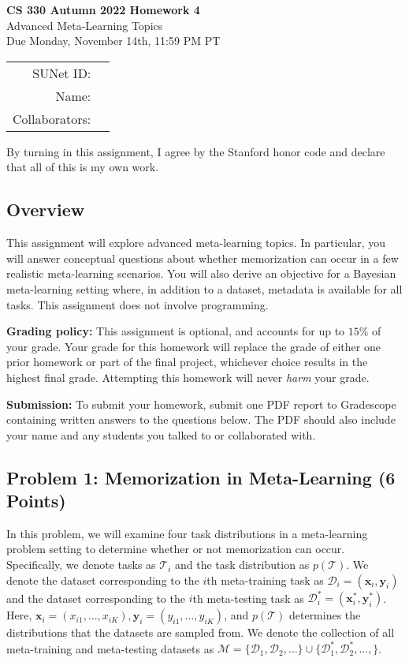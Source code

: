 \documentclass[12pt]{article}
\begin{document}
\begin{center}
{\Large \textbf{CS 330 Autumn 2022 Homework 4} \\ 
Advanced Meta-Learning Topics
\\ 
\vspace{0.2cm}
Due Monday, November 14th, 11:59 PM PT}

\begin{tabular}{rl}
SUNet ID: &  \\
Name: & \\
Collaborators: & 
\end{tabular}
\end{center}

By turning in this assignment, I agree by the Stanford honor code and declare that all of this is my own work.

\subsection*{Overview}
This assignment will explore advanced meta-learning topics.
In particular, you will answer conceptual questions about whether memorization can occur in a few realistic meta-learning scenarios.
You will also derive an objective for a Bayesian meta-learning setting where, in addition to a dataset, metadata is available for all tasks.
This assignment does not involve programming.

\textbf{Grading policy:} This assignment is optional, and accounts for up to $15\%$ of your grade. Your grade for this homework will replace the grade of either one prior homework or part of the final project, whichever choice results in the highest final grade. Attempting this homework will never \textit{harm} your grade.

\textbf{Submission:} To submit your homework, submit one PDF report to Gradescope containing written answers to the questions below. The PDF should also include your name and any students you talked to or collaborated with.


\subsection*{Problem 1: Memorization in Meta-Learning (6 Points)}
In this problem, we will examine four task distributions in a meta-learning problem setting to determine whether or not memorization can occur.
Specifically, we denote tasks as $\mathcal{T}_i$ and the task distribution as $p(\mathcal{T})$.
We denote the dataset corresponding to the $i$th meta-training task as $\mathcal{D}_i=\left(\boldsymbol{x}_i, \boldsymbol{y}_i\right)$ and the dataset corresponding to the $i$th meta-testing task as $\mathcal{D}_i^*=\left(\boldsymbol{x}_i^*, \boldsymbol{y}_i^*\right)$.
Here, $\boldsymbol{x}_i=\left(x_{i 1}, \ldots, x_{i K}\right), \boldsymbol{y}_i=\left(y_{i 1}, \ldots, y_{i K}\right)$, and $p(\mathcal{T})$ determines the distributions that the datasets are sampled from.
We denote the collection of all meta-training and meta-testing datasets as $\mathcal{M}=\{\mathcal{D}_1, \mathcal{D}_2, \ldots\} \cup \{\mathcal{D}_1^*, \mathcal{D}^*_2, \ldots, \}$.
\end{document}
